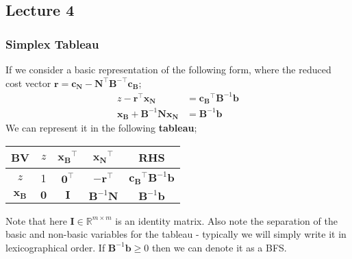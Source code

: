 \documentclass[a4paper, 12pt]{article}
\newcommand{\mat}[1]{\boldsymbol{#1}}
\renewcommand{\vec}[1]{\boldsymbol{#1}}
\begin{document}
        \subsection*{Lecture 4}
            \subsubsection*{Simplex Tableau}
                If we consider a basic representation of the following form, where the reduced cost vector $\vec{r} = \vec{c_N} - \mat{N}^\top\mat{B}^{-\top}\vec{c_B}$;
                \begin{align*}
                    z - \vec{r}^\top\vec{x_N} & = \vec{c_B}^\top\mat{B}^{-1}\vec{b} \\
                    \vec{x_B} + \mat{B}^{-1}\mat{N}\vec{x_N} & = \mat{B}^{-1}\vec{b}
                \end{align*}
                We can represent it in the following \textbf{tableau};
                \begin{center}
                    \begin{tabular}{c|ccc|c}
                        BV & $z$ & $\vec{x_B}^\top$ & $\vec{x_N}^\top$ & RHS \\
                        \hline
                        $z$ & 1 & $\vec{0}^\top$ & $-\vec{r}^\top$ & $\vec{c_B}^\top\mat{B}^{-1}\vec{b}$ \\
                        $\vec{x_B}$ & $\vec{0}$ & $\mat{I}$ & $\mat{B}^{-1}\mat{N}$ & $\mat{B}^{-1}\vec{b}$
                    \end{tabular}
                \end{center}
                Note that here $\mat{I} \in \mathbb{R}^{m \times m}$ is an identity matrix.
                Also note the separation of the basic and non-basic variables for the tableau - typically we will simply write it in lexicographical order.
                If $\mat{B}^{-1}\vec{b} \geq 0$ then we can denote it as a BFS.
                \medskip
\end{document}
